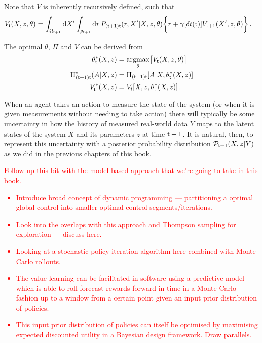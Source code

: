 Note that $V$ is inherently recursively defined, such that
\begin{align}
V_{{\sf t}}(X,z,\theta) &= \int_{\Omega_{{\sf t}+1}}{\rm d}X'\int_{\rho_{{\sf t}+1}} {\rm d}r \, P_{({\sf t}+1){\sf t}}(r,X'\vert X, z,\theta)\bigg\{ r+\gamma [\delta t({\sf t})]V_{{\sf t}+1}(X',z,\theta)\bigg\} \,.
\end{align}

The optimal $\theta$, $\Pi$ and $V$ can be derived from
\begin{align}
\theta^*_{{\sf t}}(X,z) &= \underset{\theta}{{\rm argmax}} \big[ V_{{\sf t}}(X,z,\theta)\big] \\
\Pi^*_{({\sf t}+1){\sf t}}(A\vert X,z) &= \Pi_{({\sf t}+1){\sf t}}[A\vert X,\theta^*_{{\sf t}}(X,z)] \\
V^*_{{\sf t}}(X,z) &= V_{{\sf t}}[X,z,\theta^*_{{\sf t}}(X,z)] \,.
\end{align}

When an agent takes an action to measure the state of the system (or when it is given measurements without needing to take action) there will typically be some uncertainty in how the history of measured real-world data $Y$ maps to the latent states of the system $X$ and its parameters $z$ at time ${\sf t}+1$. It is natural, then, to represent this uncertainty with a posterior probability distribution ${\cal P}_{{\sf t}+1}(X,z\vert Y)$ as we did in the previous chapters of this book.

\textcolor{red}{
Follow-up this bit with the model-based approach that we're going to take in this book.
\begin{itemize}
\item{Introduce broad concept of dynamic programming --- partitioning a optimal global control into smaller optimal control segments/iterations.}
\item{Look into the overlaps with this approach and Thompson sampling for exploration --- discuss here.}
\item{Looking at a stochastic policy iteration algorithm here combined with Monte Carlo rollouts.}
\item{The value learning can be facilitated in software using a predictive model which is able to roll forecast rewards forward in time in a Monte Carlo fashion up to a window from a certain point given an input prior distribution of policies.}
\item{This input prior distribution of policies can itself be optimised by maximising expected discounted utility in a Bayesian design framework. Draw parallels.}
\end{itemize}
}